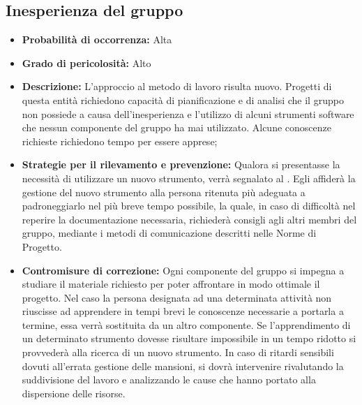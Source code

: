 \subsection{Inesperienza del gruppo}
\begin{itemize}
\item \textbf{Probabilità di occorrenza:} Alta
\item \textbf{Grado di pericolosità:} Alto
\item \textbf{Descrizione:} L'approccio al metodo di lavoro risulta nuovo. Progetti di questa entità richiedono capacità di pianificazione e di analisi che il gruppo non possiede a causa dell'inesperienza e l'utilizzo di alcuni strumenti software che nessun componente del gruppo ha mai utilizzato. Alcune conoscenze richieste richiedono tempo per essere apprese;

\item \textbf{Strategie per il rilevamento e prevenzione:} Qualora si presentasse la necessità di utilizzare un nuovo strumento, verrà segnalato al \ruoloResponsabile. Egli affiderà la gestione del nuovo strumento alla persona ritenuta più adeguata a padroneggiarlo nel più breve tempo possibile, la quale, in caso di difficoltà nel reperire la documentazione necessaria, richiederà consigli agli altri membri del gruppo, mediante i metodi di comunicazione descritti nelle Norme di Progetto. 

\item \textbf{Contromisure di correzione:} Ogni componente del gruppo si impegna a studiare il materiale richiesto per poter affrontare in modo ottimale il progetto. Nel caso la persona designata ad una determinata attività non riuscisse ad apprendere in tempi brevi le conoscenze necessarie a portarla a termine, essa verrà sostituita da un altro componente. Se l'apprendimento di un determinato strumento dovesse risultare impossibile in un tempo ridotto si provvederà alla ricerca di un nuovo strumento. In caso di ritardi sensibili dovuti all'errata gestione delle mansioni, si dovrà intervenire rivalutando la suddivisione
del lavoro e analizzando le cause che hanno portato alla dispersione delle risorse.
\end{itemize}

